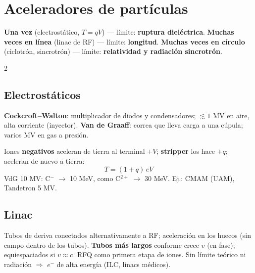 \documentclass[10pt,a4paper]{article}
\newcommand{\imp}[1]{\textbf{\color{BrickRed}#1}}
\begin{document}
\section{Aceleradores de partículas}
\begin{clave}
\textbf{Una vez} (electrostático, $T=qV$) --- límite: \imp{ruptura dieléctrica}. \textbf{Muchas veces en línea} (linac de RF) --- límite: \imp{longitud}.
\textbf{Muchas veces en círculo} (ciclotrón, sincrotrón) --- límite: \imp{relatividad y radiación sincrotrón}.
\end{clave}
\begin{multicols}{2}
\subsection{Electrostáticos}
\textbf{Cockcroft--Walton}: multiplicador de diodos y condensadores; $\lesssim1$ MV en aire, alta corriente (inyector).
\textbf{Van de Graaff}: correa que lleva carga a una cúpula; varios MV en gas a presión.
\begin{clave}[Tándem]
Iones \textbf{negativos} aceleran de tierra al terminal $+V$; \textbf{stripper} los hace $+q$; aceleran de nuevo a tierra:
\[ T=(1+q)\,eV \]
VdG 10 MV: C$^-$ $\to$ 10 MeV, como C$^{2+}$ $\to$ 30 MeV. Ej.: CMAM (UAM), Tandetron 5 MV.
\end{clave}
\subsection{Linac}
Tubos de deriva conectados alternativamente a RF; aceleración en los huecos (sin campo dentro de los tubos). \textbf{Tubos más largos} conforme crece $v$ (en fase); equiespaciados si $v\approx c$.
RFQ como primera etapa de iones. Sin límite teórico ni radiación $\Rightarrow$ $e^-$ de alta energía (ILC, linacs médicos).

\end{multicols}
\end{document}

